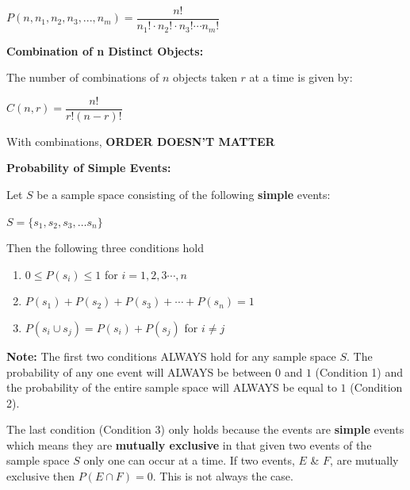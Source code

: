 \documentclass[12pt]{article}
\newenvironment{myindentpar}[1]%
     {\begin{list}{}%
             {\setlength{\leftmargin}{#1}}%
             \item[]%
     }
     {\end{list}}
\begin{document}
\centerline{$P(n,n_{1},n_{2},n_{3},...,n_{m}) = \dfrac{n!}{n_{1}! \cdot n_{2}! \cdot n_{3}! \cdots n_{m}!}$}


\vspace{.5cm}

\textbf{Combination of n Distinct Objects:} 

The number of combinations of $n$ objects taken $r$ at a time is given by:
\newline

\centerline{$C(n,r) = \dfrac{n!}{r!(n-r)!}$}

\vspace{.5cm}

With combinations, \textbf{ORDER DOESN'T MATTER}

\vspace{.5cm}


\textbf{Probability of Simple Events:}

Let $S$ be a sample space consisting of the following \textbf{simple} events:
\newline

\centerline{$S = \{s_{1}, s_{2}, s_{3}, \dots s_{n}\}$}

Then the following three conditions hold

\begin{enumerate}
\item $0 \leq P(s_{i}) \leq 1$ \hspace{4.3cm} for $i = 1, 2, 3 \cdots, n$
\item $P(s_{1}) + P(s_{2}) + P(s_{3}) + \cdots + P(s_{n}) = 1$
\item $P(s_{i} \cup s_{j}) = P(s_{i}) + P(s_{j})$ \hspace{2cm} for $ i \neq j$ 
\end{enumerate}

\begin{myindentpar}{1cm}\textbf{Note:} The first two conditions ALWAYS hold for any sample space $S$. The probability of any one event will ALWAYS be between $0$ and $1$ (Condition 1) and the probability of the entire sample space will ALWAYS be equal to $1$ (Condition 2).

 The last condition (Condition 3) only holds because the events are \textbf{simple} events which means they are \textbf{mutually exclusive} in that given two events of the sample space $S$ only one can occur at a time. If two events, $E$ \& $ F$, are mutually exclusive then $P(E \cap F) = 0$. This is not always the case.
\end{myindentpar}
\end{document}
